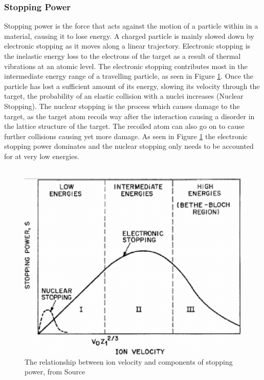 \documentclass[12pt,a4paper]{article}
\begin{document}
\subsubsection{Stopping Power}
\label{stop}
Stopping power is the force that acts against the motion of a particle within in a material, causing it to lose energy. A charged particle is mainly slowed down by electronic stopping as it moves along a linear trajectory. Electronic stopping is the inelastic energy loss to the electrons of the target as a result of thermal vibrations at an atomic level. The electronic stopping contributes most in the intermediate energy range of a travelling particle, as seen in Figure \ref{stprg}. Once the particle has lost a sufficient amount of its energy, slowing its velocity through the target, the probability of an elastic collision with a nuclei increases (Nuclear Stopping). The nuclear stopping is the process which causes damage to the target, as the target atom recoils way after the interaction causing a disorder in the lattice structure of the target. The recoiled atom can also go on to cause further collisions causing yet more damage. As seen in Figure \ref{stprg} the electronic stopping power dominates and the nuclear stopping only needs to be accounted for at very low energies.
\\\\
\begin{figure}[h!]
\centering
\includegraphics[scale=0.4]{Images//Stopping//stoppingrange.png}
\caption[width=\columnwidth]{The relationship between ion velocity and components of stopping power, from Source \cite{stprg}}
\label{stprg}
\end{figure}
\end{document}
